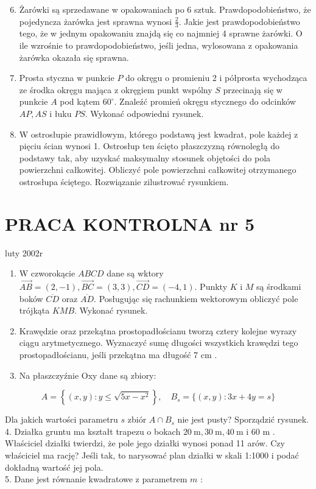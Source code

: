 \documentclass[10pt]{article}
\begin{document}
\begin{enumerate}
  \setcounter{enumi}{5}
  \item Żarówki są sprzedawane w opakowaniach po 6 sztuk. Prawdopodobieństwo, że pojedyncza żarówka jest sprawna wynosi $\frac{2}{3}$. Jakie jest prawdopodobieństwo tego, że w jednym opakowaniu znajdą się co najmniej 4 sprawne żarówki. O ile wzrośnie to prawdopodobieństwo, jeśli jedna, wylosowana z opakowania żarówka okazała się sprawna.
  \item Prosta styczna w punkcie $P$ do okręgu o promieniu 2 i półprosta wychodząca ze środka okręgu mająca z okręgiem punkt wspólny $S$ przecinają się w punkcie $A$ pod kątem $60^{\circ}$. Znaleźć promień okręgu stycznego do odcinków $A P, A S$ i łuku $P S$. Wykonać odpowiedni rysunek.
  \item W ostrosłupie prawidłowym, którego podstawą jest kwadrat, pole każdej z pięciu ścian wynosi 1. Ostrosłup ten ścięto płaszczyzną równoległą do podstawy tak, aby uzyskać maksymalny stosunek objętości do pola powierzchni całkowitej. Obliczyć pole powierzchni całkowitej otrzymanego ostrosłupa ściętego. Rozwiązanie zilustrować rysunkiem.
\end{enumerate}

\section*{PRACA KONTROLNA nr 5}
luty 2002r

\begin{enumerate}
  \item W czworokącie $A B C D$ dane są wktory $\overrightarrow{A B}=(2,-1), \overrightarrow{B C}=(3,3), \overrightarrow{C D}=(-4,1)$. Punkty $K$ i $M$ są środkami boków $\overline{C D}$ oraz $\overline{A D}$. Posługując się rachunkiem wektorowym obliczyć pole trójkąta $K M B$. Wykonać rysunek.
  \item Krawędzie oraz przekątna prostopadłościanu tworzą cztery kolejne wyrazy ciągu arytmetycznego. Wyznaczyć sumę długości wszystkich krawędzi tego prostopadłościanu, jeśli przekątna ma długość 7 cm .
  \item Na płaszczyźnie Oxy dane są zbiory:
\end{enumerate}

$$
A=\left\{(x, y): y \leqslant \sqrt{5 x-x^{2}}\right\}, \quad B_{s}=\{(x, y): 3 x+4 y=s\}
$$

Dla jakich wartości parametru $s$ zbiór $A \cap B_{s}$ nie jest pusty? Sporządzić rysunek.\\
4. Działka gruntu ma kształt trapezu o bokach $20 \mathrm{~m}, 30 \mathrm{~m}, 40 \mathrm{~m}$ i 60 m . Właściciel działki twierdzi, że pole jego działki wynosi ponad 11 arów. Czy właściciel ma rację? Jeśli tak, to narysować plan działki w skali 1:1000 i podać dokładną wartość jej pola.\\
5. Dane jest równanie kwadratowe z parametrem $m$ :
\end{document}
